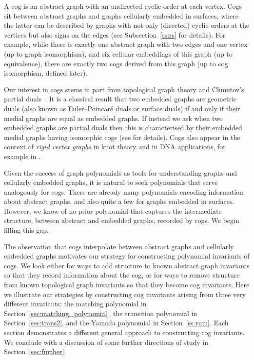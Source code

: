 \documentclass{amsart}
\theoremstyle{definition}
\theoremstyle{remark}
\numberwithin{equation}{section}
\begin{document}
A cog is an abstract graph with an undirected cyclic order at each vertex.
 Cogs sit between abstract graphs and graphs cellularly embedded in surfaces, where the latter can be described by graphs with not only (directed) cyclic orders at the vertices but also signs on the edges (see Subsection~\ref{ss:rs} for details).  For example, while there is exactly one abstract graph with two edges and one vertex (up to graph isomorphism), and six cellular embeddings of this graph (up to equivalence), there are exactly two cogs derived from this graph (up to cog isomorphism, defined later).



Our interest in cogs stems in part from topological graph theory and Chmutov's partial duals~\cite{zbMATH05569114}. It is a classical result that two embedded graphs are geometric duals (also known as Euler--Poincar\'e duals or surface duals)  if and only if their medial graphs are equal as embedded graphs. 
If instead we ask when two embedded graphs are partial duals then this is characterised by their embedded medial graphs having isomorphic cogs (see \cite{MR2869185} for details). Cogs also appear in the context  of \emph{rigid vertex graphs} in knot theory and in DNA applications, for example in \cite{B+15,B+13,Kau89}.

Given the success of graph polynomials as tools for understanding graphs and cellularly embedded graphs, it is natural to seek polynomials that serve analogously for cogs.  There are already many polynomials encoding information about abstract graphs, and also quite a few for graphs embedded in surfaces.  However, we know of no prior polynomial that captures the intermediate structure, between abstract and embedded graphs, recorded by cogs.  We begin filling this gap.

The observation that cogs interpolate between abstract graphs and cellularly embedded graphs motivates our strategy for constructing polynomial invariants of cogs.  We look either for ways to add structure to known abstract graph invariants so that they record information about the cog, or for ways to remove structure from known topological graph invariants so that they become cog invariants. Here we illustrate our strategies by constructing cog invariants arising from three very different invariants: the matching polynomial in Section~\ref{sec:matching_polynomial}, the transition polynomial in Section~\ref{sec:trans2}, and the Yamada polynomial in Section~\ref{ss.yam}. Each section demonstrates a different general approach to constructing cog invariants. We conclude with a discussion of some further directions of study in Section~\ref{sec:further}.
\end{document}
